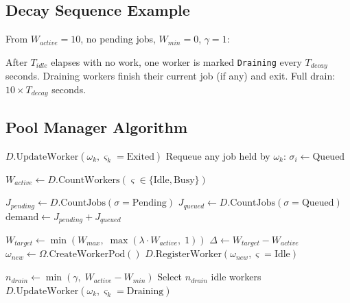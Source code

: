 \documentclass[11pt]{article}
\begin{document}
\subsection{Decay Sequence Example}

From $W_{active} = 10$, no pending jobs, $W_{min} = 0$, $\gamma = 1$:

After $T_{idle}$ elapses with no work, one worker is marked \texttt{Draining} every
$T_{decay}$ seconds. Draining workers finish their current job (if any) and exit.
Full drain: $10 \times T_{decay}$ seconds.


\subsection{Pool Manager Algorithm}

\begin{algorithm}[H]
\caption{Pool Scaling (Server-Side)}
\begin{algorithmic}[1]

  \State {}
      \State $D.\text{UpdateWorker}(\omega_k, \varsigma_k = \text{Exited})$
      \State Requeue any job held by $\omega_k$: $\sigma_i \gets \text{Queued}$
    \EndIf
  \EndFor

  \State $W_{active} \gets D.\text{CountWorkers}(\varsigma \in \{\text{Idle}, \text{Busy}\})$

  \State {}
  \State $J_{pending} \gets D.\text{CountJobs}(\sigma = \text{Pending})$
  \State $J_{queued} \gets D.\text{CountJobs}(\sigma = \text{Queued})$
  \State $\text{demand} \gets J_{pending} + J_{queued}$

    \State $W_{target} \gets \min(W_{max},\; \max(\lambda \cdot W_{active},\; 1))$
    \State $\Delta \gets W_{target} - W_{active}$
      \State $\omega_{new} \gets \Omega.\text{CreateWorkerPod}()$
      \State $D.\text{RegisterWorker}(\omega_{new}, \varsigma = \text{Idle})$
    \EndFor
  \EndIf

  \State {}
      \State $n_{drain} \gets \min(\gamma, \; W_{active} - W_{min})$
      \State Select $n_{drain}$ idle workers
        \State $D.\text{UpdateWorker}(\omega_k, \varsigma_k = \text{Draining})$
      \EndFor
    \EndIf
  \EndIf

\EndProcedure
\end{algorithmic}
\end{algorithm}
\end{document}
